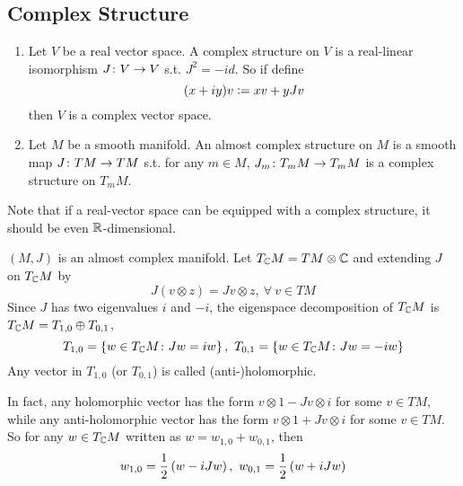 \documentclass[a4paper,12pt]{article}
\begin{document}
	\subsection{Complex Structure}

	\begin{defn}
		\begin{enumerate}
			\item Let $V$ be a real vector space. A complex structure on $V$ is a real-linear isomorphism $J \colon V \rightarrow V$ s.t. $J^2 = -id$. So if define
			\begin{equation*}
				(x+iy)v \vcentcolon= xv+yJv
			\end{equation*}
			then $V$ is a complex vector space.
			\item Let $M$ be a smooth manifold. An almost complex structure on $M$ is a smooth map $J \colon TM \rightarrow TM$ s.t. for any $m \in M$, $J_m \colon T_mM \rightarrow T_mM$ is a complex structure on $T_mM$.
		\end{enumerate}
	\end{defn}
	\begin{rem}
		Note that if a real-vector space can be equipped with a complex structure, it should be even $\mathbb{R}$-dimensional.
	\end{rem}
	$(M,J)$ is an almost complex manifold. Let $T_{\mathbb{C}}M = TM \otimes \mathbb{C}$ and extending $J$ on $T_{\mathbb{C}}M$ by
	\begin{equation*}
		J(v \otimes z) = Jv \otimes z,~\forall~ v \in TM
	\end{equation*}
	Since $J$ has two eigenvalues $i$ and $-i$, the eigenspace decomposition of $T_{\mathbb{C}}M$ is $T_{\mathbb{C}}M = T_{1,0}\oplus T_{0,1}$,
	\begin{equation*}
		T_{1,0} = \left\{w \in T_{\mathbb{C}}M \colon Jw = iw\right\},~T_{0,1} = \left\{w \in T_{\mathbb{C}}M \colon Jw = -iw\right\}
	\end{equation*}
	Any vector in $T_{1,0}$ (or $T_{0,1}$) is called (anti-)holomorphic.

	In fact, any holomorphic vector has the form $v \otimes 1-Jv \otimes i$ for some $v \in TM$, while any anti-holomorphic vector has the form $v \otimes 1+Jv \otimes i$ for some $v \in TM$. So for any $w \in T_{\mathbb{C}}M$ written as $w = w_{1,0}+w_{0,1}$, then
	\begin{equation*}
		w_{1,0} = \frac{1}{2} \left(w-iJw\right),~w_{0,1} = \frac{1}{2} \left(w+iJw\right)
	\end{equation*}
	
\end{document}
